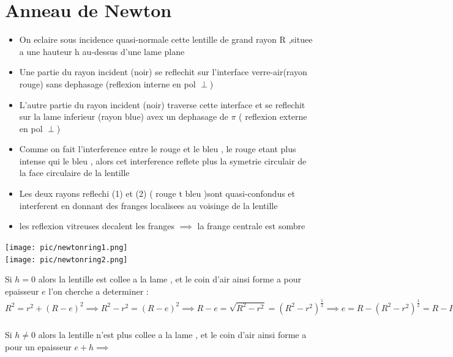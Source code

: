 \documentclass[12pt]{book}
\begin{document}
        \section{Anneau de Newton}
            \begin{center}
                \begin{minipage}{0.69\linewidth}
                    \begin{itemize}
                        \item On eclaire sous incidence quasi-normale cette lentille de grand rayon R ,situee a une hauteur h au-dessus d'une lame plane 
                        \item Une partie du rayon incident (noir) se reflechit sur l'interface verre-air(rayon rouge) sans dephasage (reflexion interne en pol $\perp$)
                        \item L'autre partie du rayon incident (noir) traverse cette interface et se reflechit sur la lame inferieur (rayon blue) avex un dephasage de $\pi$ ( reflexion externe en pol $\perp$)
                        \item Comme on fait l'interference entre le rouge et le bleu , le rouge etant plus intense qui le bleu , alors cet interference reflete plus la symetrie circulair de la face circulaire de la lentille 
                        \item Les deux rayons reflechi (1) et (2) ( rouge t bleu )sont quasi-confondus et interferent en donnant des franges localisees au voisinge de la lentille 
                        \item les reflexion vitreuses decalent les franges $\implies$ la frange centrale est sombre
                    \end{itemize}
                \end{minipage}
                \begin{minipage}{0.3\linewidth}
                    \texttt{[image: pic/newtonring1.png]}
                    \\
                    \texttt{[image: pic/newtonring2.png]}
                \end{minipage}
            \end{center}
            Si $h=0$ alors la lentille est collee a la lame , et le coin d'air ainsi forme a pour epaisseur $e$ l'on cherche a determiner :\\
            $R^2= r^2+(R-e)^2 \implies R^2 - r^2 = (R-e)^2 \implies R-e = \sqrt{R^2-r^2} = (R^2-r^2)^{\frac{1}{2}}\implies e = R-(R^2-r^2)^{\frac{1}{2}} = R-R(1-\frac{r^2}{R^2})^{\frac{1}{2}}\approx R-R(1-\frac{1}{2}\frac{r^2}{R^2}) = \frac{1}{2}\frac{r^2}{R}$\\
             \\
            Si $h \not = 0$ alors la lentille n'est plus collee a la lame , et le coin d'air ainsi forme a pour un epaisseur $e+h \implies $ 
\end{document}
